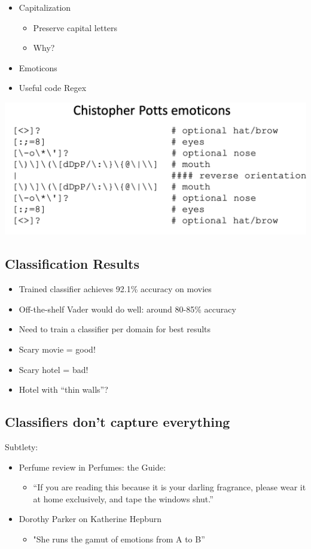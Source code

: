 \documentclass[11pt]{article}
\theoremstyle{definition}
\begin{document}
\begin{itemize}
  \item Capitalization
  \begin{itemize}
    \item Preserve capital letters
    \item Why?
  \end{itemize}
  \item Emoticons
  \item Useful code Regex
\end{itemize}
\includegraphics[width=\textwidth]{13.png}

\subsection{Classification Results}
\begin{itemize}
  \item Trained classifier achieves 92.1\% accuracy on movies
  \item Off-the-shelf Vader would do well: around 80-85\% accuracy
\end{itemize}
\begin{itemize}
  \item Need to train a classifier per domain for best results
  \item Scary movie = good!
  \item Scary hotel = bad!
  \item Hotel with “thin walls”?
\end{itemize}

\subsection{Classifiers don’t capture everything}
Subtlety:

\begin{itemize}
  \item Perfume review in Perfumes: the Guide:
  \begin{itemize}
    \item “If you are reading this because it is your darling fragrance,
    please wear it at home exclusively, and tape the windows
    shut.”
  \end{itemize}
  \item Dorothy Parker on Katherine Hepburn
  \begin{itemize}
    \item "She runs the gamut of emotions from A to B”
  \end{itemize}
\end{itemize}
\end{document}
